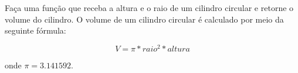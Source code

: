 
\question[10]

Faça uma função que receba a altura e o raio de um cilindro circular e retorne o volume do cilindro. O volume de um cilindro circular é calculado por meio da seguinte fórmula: 

\begin{equation*}
	V = \pi * raio^2 * altura
\end{equation*}

onde $\pi = 3.141592$.


